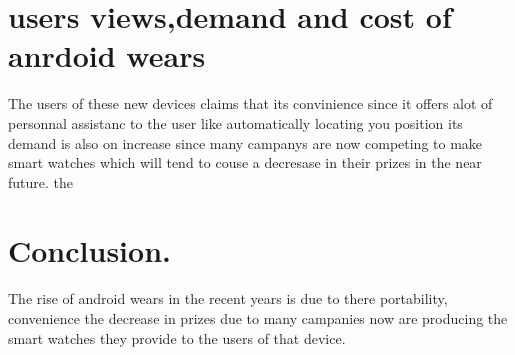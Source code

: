 \documentclass[9pt,a4paper]{article}
\begin{document}
\section{users views,demand and cost of anrdoid wears}
The users of these new devices claims that its convinience since it offers alot of personnal assistanc to the user like automatically locating you position its demand is also on increase since many campanys are now competing to make smart watches which will tend to couse a decresase in their prizes in the near future.
the
\section{Conclusion.}
The rise of android wears in the recent  years is due to there portability, convenience the decrease in prizes due to many campanies now are producing the smart watches they provide to the users 
of that device.

\newpage



\end{document}

